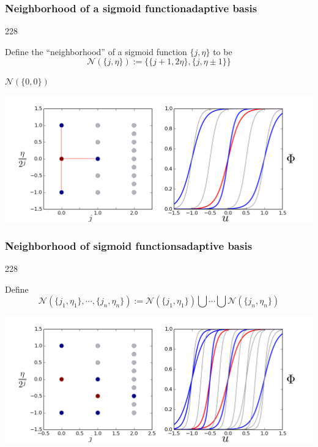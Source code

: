 \documentclass{beamer}
\newcommand{\barrow}{\item[\color{darkred}\ding{228}]}
\begin{document}
\begin{frame}
    \frametitle{Neighborhood of a sigmoid function\hfill \scriptsize{adaptive basis}}\small
    \begin{dinglist}{228}
        \barrow
        Define the ``neighborhood'' of a sigmoid function $\{j, \eta\}$ 
        to be
        $$
            \mathcal{N}(\{j, \eta\}) := \big\{ \{j+1, 2\eta\}, \{j, \eta\pm 1\}\big\}
        $$
        \barrow $\mathcal{N}(\{0,0\})$ 
        \begin{center}
            \includegraphics[width=10.cm]{basis_neighbor.png}
        \end{center}
    \end{dinglist}
\end{frame}

\begin{frame}
    \frametitle{Neighborhood of sigmoid functions\hfill \scriptsize{adaptive basis}}\small
    \begin{dinglist}{228}
        \barrow Define
        $$
            \mathcal{N}(\{j_1, \eta_1\}, \cdots, \{j_n, \eta_n\})
            := \mathcal{N}(\{j_1, \eta_1\})\bigcup \cdots \bigcup \mathcal{N}(\{j_n, \eta_n\})
        $$
        \begin{center}
            \includegraphics[width=10.cm]{basis_neighbor_2.png}
        \end{center}
    \end{dinglist}
\end{frame}
\end{document}
